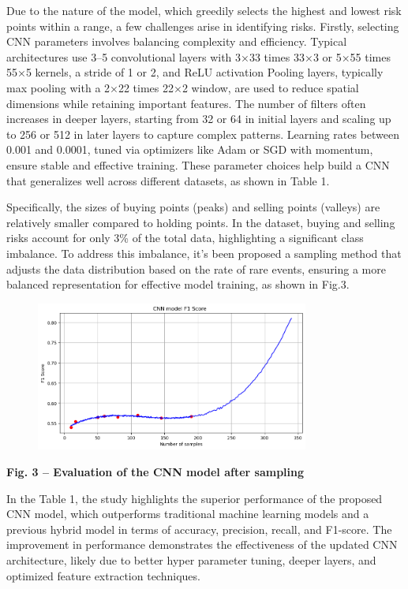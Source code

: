 {Due to the nature of the model, which greedily selects the highest and
lowest risk points within a range, a few challenges arise in identifying
risks. Firstly, selecting CNN parameters involves balancing complexity
and efficiency. Typical architectures use 3--5 convolutional layers with
3×33 times 33×3 or 5×55 times 55×5 kernels, a stride of 1 or 2, and ReLU
activation Pooling layers, typically max pooling with a 2×22 times 22×2
window, are used to reduce spatial dimensions while retaining important
features. The number of filters often increases in deeper layers,
starting from 32 or 64 in initial layers and scaling up to 256 or 512 in
later layers to capture complex patterns. Learning rates between 0.001
and 0.0001, tuned via optimizers like Adam or SGD with momentum, ensure
stable and effective training. These parameter choices help build a CNN
that generalizes well across different datasets, as shown in Table 1.

Specifically, the sizes of buying points (peaks) and selling points
(valleys) are relatively smaller compared to holding points. In the
dataset, buying and selling risks account for only 3\% of the total
data, highlighting a significant class imbalance. To address this
imbalance, it's been proposed a sampling method that adjusts the data
distribution based on the rate of rare events, ensuring a more balanced
representation for effective model training, as shown in Fig.3.

\begin{figure}[H]
	\centering
	\includegraphics[width=0.8\textwidth]{media/ict2/image11}
	\caption*{}
\end{figure}


{\bfseries Fig. 3 -- Evaluation of the CNN model after sampling}

In the Table 1, the study highlights the superior performance of the
proposed CNN model, which outperforms traditional machine learning
models and a previous hybrid model in terms of accuracy, precision,
recall, and F1-score. The improvement in performance demonstrates the
effectiveness of the updated CNN architecture, likely due to better
hyper parameter tuning, deeper layers, and optimized feature extraction
techniques.

}
